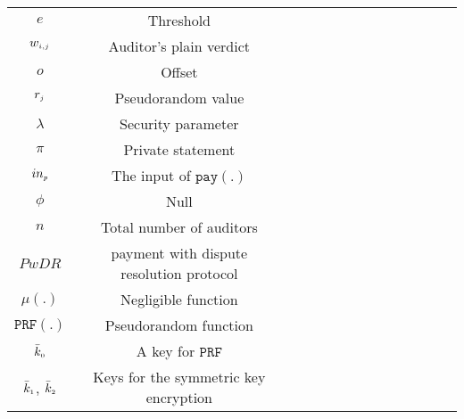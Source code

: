\begin{table}[!htbp]
\begin{scriptsize}
\begin{center}
{{\begin{tabular}{|c|c|c|c|c|c|c|c|c|c|c|c|c|c|}
%
\cellcolor{white!20}\scriptsize$e$ &\cellcolor{white!20}\scriptsize  Threshold\\ 
%            
 \cellcolor{gray!20}\scriptsize$w_{\scriptscriptstyle i,j}$ &\cellcolor{gray!20}\scriptsize  Auditor's plain verdict\\ 
%     
\cellcolor{white!20}\scriptsize$o$ &\cellcolor{white!20}\scriptsize  Offset\\  
  \cellcolor{gray!20}\scriptsize$r_{\scriptscriptstyle j}$ &\cellcolor{gray!20}\scriptsize  Pseudorandom value\\   
\cellcolor{white!20}\scriptsize$\lambda$ &\cellcolor{white!20}\scriptsize Security parameter\\                
%
\cellcolor{gray!20}\scriptsize$\pi$ &\cellcolor{gray!20}\scriptsize Private statement\\        
\cellcolor{white!20}\scriptsize$in_{\scriptscriptstyle p}$ &\cellcolor{white!20}\scriptsize The input of $\mathtt{pay}(.)$\\    
%
\cellcolor{gray!20}\scriptsize$\phi$ &\cellcolor{gray!20}\scriptsize  Null\\ 
%
\cellcolor{white!20}\scriptsize$n$ &\cellcolor{white!20}\scriptsize  Total number of auditors\\  
%           
\cellcolor{gray!20}\scriptsize$PwDR$ &\cellcolor{gray!20}\scriptsize  payment with dispute resolution protocol\\ 
%
\cellcolor{white!20}\scriptsize$\mu(.)$ &\cellcolor{white!20}\scriptsize Negligible function\\  
%
\cellcolor{gray!20}\scriptsize$\mathtt{PRF}(.)$ &\cellcolor{gray!20}\scriptsize  Pseudorandom function \\ 
%
\cellcolor{white!20}\scriptsize$\bar k_{\scriptscriptstyle 0}$ &\cellcolor{white!20}\scriptsize A key for $\mathtt{PRF}$\\ 
%
\cellcolor{gray!20}\scriptsize $\bar k_{\scriptscriptstyle 1}$, $\bar k_{\scriptscriptstyle 2}$ &\cellcolor{gray!20}\scriptsize Keys for the symmetric key encryption\\ 

%
\hline 
\end{tabular}\label{table:notation-table}
%
}
}
\end{center}
\end{scriptsize}
\end{table}

\vspace{-2mm}




























